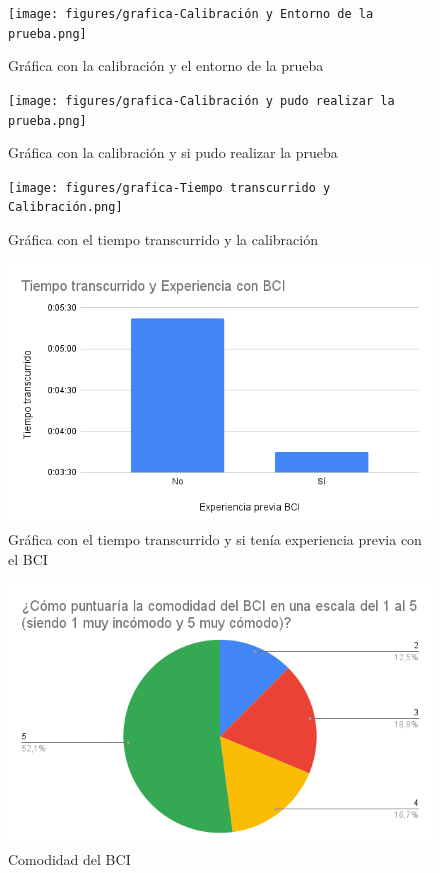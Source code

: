 \begin{figure}[!htb]
   \centering
    \texttt{[image: figures/grafica-Calibración y Entorno de la prueba.png]}
   \caption{Gráfica con la calibración y el entorno de la prueba}
   \label{figure:calibrationandtestenvironment}
\end{figure}

\begin{figure}[!htb]
   \centering
    \texttt{[image: figures/grafica-Calibración y pudo realizar la prueba.png]}
   \caption{Gráfica con la calibración y si pudo realizar la prueba}
   \label{figure:calibrationanddothetest}
\end{figure}

\begin{figure}[!htb]
   \centering
    \texttt{[image: figures/grafica-Tiempo transcurrido y Calibración.png]}
   \caption{Gráfica con el tiempo transcurrido y la calibración}
   \label{figure:timeelapsedandcalibration}
\end{figure}

\begin{figure}[!htb]
   \centering
    \includegraphics[width=0.7\linewidth]{figures/grafica-Tiempo transcurrido y Experiencia con BCI.png}
   \caption{Gráfica con el tiempo transcurrido y si tenía experiencia previa con el BCI}
   \label{figure:timeelapsedandpreviousexperience}
\end{figure}

\begin{figure}[!htb]
   \centering
    \includegraphics[width=0.7\linewidth]{figures/grafica-¿Cómo puntuaría la comodidad del BCI en una escala del 1 al 5 (siendo 1 muy incómodo y 5 muy cómodo)_.png}
   \caption{Comodidad del BCI}
   \label{figure:comfortableexperience}
\end{figure}


